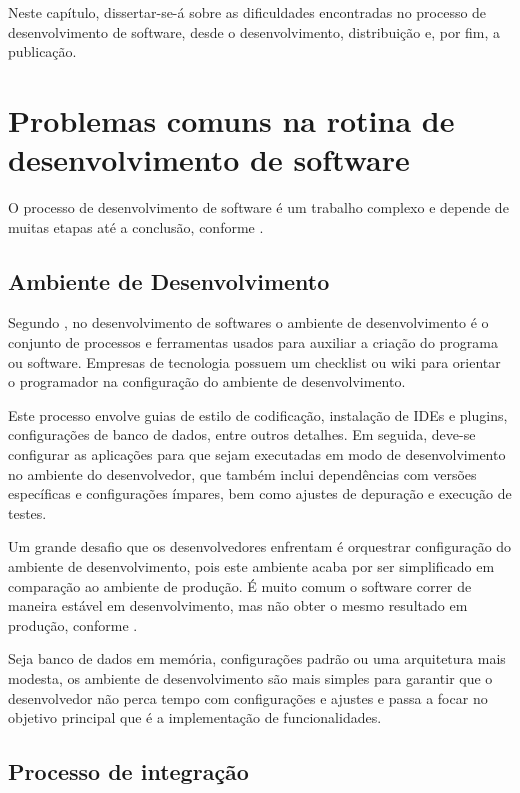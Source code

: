 \documentclass[
	12pt,				%
	openright,			%
	oneside,			%
	a4paper,			%
	chapter=TITLE,		%
	section=TITLE,		%
	english,			%
	french,				%
	spanish,			%
	brazil				%
	]{abntex2}
\begin{document}
Neste capítulo, dissertar-se-á sobre as dificuldades encontradas no processo de desenvolvimento de software, desde o desenvolvimento, distribuição e, por fim, a publicação.

\section{Problemas comuns na rotina de desenvolvimento de software}

O processo de desenvolvimento de software é um trabalho complexo e depende de muitas etapas até a conclusão, conforme .

\subsection{Ambiente de Desenvolvimento}

Segundo , no desenvolvimento de softwares o ambiente de desenvolvimento é o conjunto de processos e ferramentas usados para auxiliar a criação do programa ou software. Empresas de tecnologia possuem um checklist ou wiki para orientar o programador na configuração do ambiente de desenvolvimento.

Este processo envolve guias de estilo de codificação, instalação de IDEs e plugins, configurações de banco de dados, entre outros detalhes. Em seguida, deve-se configurar as aplicações para que sejam executadas em modo de desenvolvimento no ambiente do desenvolvedor, que também inclui dependências com versões específicas e configurações ímpares, bem como ajustes de depuração e execução de testes.

Um grande desafio que os desenvolvedores enfrentam é orquestrar configuração do ambiente de desenvolvimento, pois este ambiente acaba por ser simplificado em comparação ao ambiente de produção. É muito comum o software correr de maneira estável em desenvolvimento, mas não obter o mesmo resultado em produção, conforme .

Seja banco de dados em memória, configurações padrão ou uma arquitetura mais modesta, os ambiente de desenvolvimento são mais simples para garantir que o desenvolvedor não perca tempo com configurações e ajustes e passa a focar no objetivo principal que é a implementação de funcionalidades. 

\subsection{Processo de integração}
\end{document}
